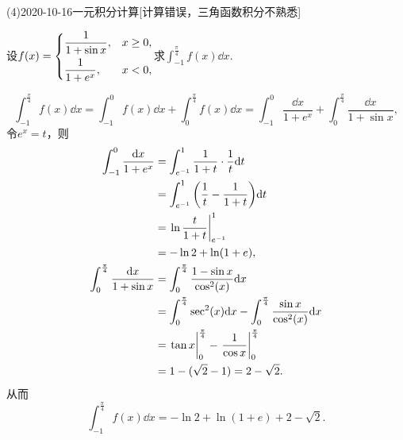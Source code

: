 \documentclass{ctexart}
\begin{document}
\begin{mathques}(4){2020-10-16}{一元积分计算}[计算错误，三角函数积分不熟悉]
\begin{ques}
  设$f(x) =
\begin{dcases}
  \frac{1}{1 + \sin x}, & x \ge 0,\\
  \frac{1}{1 + e^x}, & x < 0,
\end{dcases}
$求$\int_{-1}^{\frac{\pi}{4}}f(x)\dd x.$
\end{ques}
\begin{solu}
  \[
    \int_{-1}^{\frac{\pi}{4}}f(x) \dd x = \int_{-1}^{0} f(x) \dd x + \int_{0}
    ^{\frac{\pi}{4}} f(x) \dd x = \int_{-1}^{0} \frac{\dd x}{1 + e^x} +
    \int_{0}^{\frac{\pi}{4}} \frac{\dd x}{1 + \sin x},
  \]
  令$e^x = t$，则
  \begin{align*}
    \int_{-1}^{0}\frac{\dd x}{1 + e^x} &= \int_{e^{-1}}^{1} \frac{1}{1 + t}
    \cdot \frac{1}{t} \dd t\\
    &= \int_{e^{-1}}^{1} \qty(\frac{1}{t} - \frac{1}{1 + t}) \dd t\\
    &= \eval{\ln \frac{t}{1 + t}}_{e^{-1}}^1\\
    &= -\ln 2 + \ln (1 + e),\\
    \int_{0}^{\frac{\pi}{4}}\frac{\dd x}{1 + \sin x} &= \int_{0}^{\frac{\pi}
    {4}} \frac{1 - \sin x}{\cos[2](x)} \dd x\\
    &= \int_{0}^{\frac{\pi}{4}} \sec[2](x)\dd x - \int_{0}^{\frac{\pi}{4}}
    \frac{\sin x}{\cos[2](x)} \dd x\\
    &= \eval{\tan x}_{0}^{\frac{\pi}{4}} - \eval{\frac{1}{\cos x}}_{0}
    ^{\frac{\pi}{4}} \\
    & = 1 - (\sqrt{2} - 1) = 2 - \sqrt{2}.
  \end{align*}
  从而
  \[
    \int_{-1}^{\frac{\pi}{4}} f(x)\dd x = - \ln 2 + \ln(1 + e) + 2 - \sqrt{2}.
  \]
\end{solu}
\end{mathques}
\end{document}
